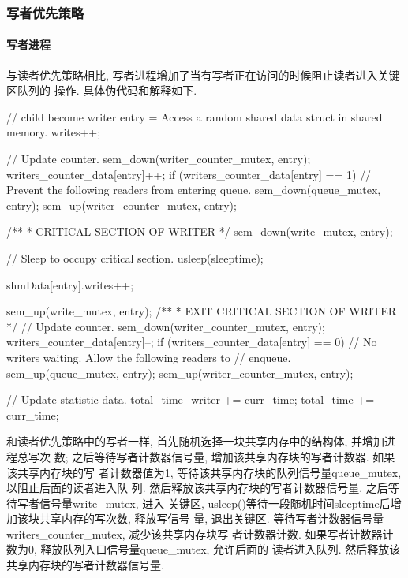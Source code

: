 \subsubsection{写者优先策略}
\paragraph{写者进程}
与读者优先策略相比, 写者进程增加了当有写者正在访问的时候阻止读者进入关键区队列的
操作. 具体伪代码和解释如下.
\begin{code}
// child become writer
entry = Access a random shared data struct in shared memory.
writes++;

// Update counter.
sem_down(writer_counter_mutex, entry);
writers_counter_data[entry]++;
if (writers_counter_data[entry] == 1) {
        // Prevent the following readers from entering queue.
        sem_down(queue_mutex, entry);
    }
sem_up(writer_counter_mutex, entry);

/**
* CRITICAL SECTION OF WRITER
*/
sem_down(write_mutex, entry);

// Sleep to occupy critical section.
    usleep(sleeptime);

    shmData[entry].writes++;

sem_up(write_mutex, entry);
    /**
    * EXIT CRITICAL SECTION OF WRITER
    */
// Update counter.
sem_down(writer_counter_mutex, entry);
writers_counter_data[entry]--;
if (writers_counter_data[entry] == 0) {
        // No writers waiting. Allow the following readers to
        // enqueue.
        sem_up(queue_mutex, entry);
    }
sem_up(writer_counter_mutex, entry);

    // Update statistic data.
    total_time_writer += curr_time;
    total_time += curr_time;

\end{code}

和读者优先策略中的写者一样, 首先随机选择一块共享内存中的结构体, 并增加进程总写次
数; 之后等待写者计数器信号量, 增加该共享内存块的写者计数器. 如果该共享内存块的写
者计数器值为1, 等待该共享内存块的队列信号量queue\_mutex, 以阻止后面的读者进入队
列. 然后释放该共享内存块的写者计数器信号量. 之后等待写者信号量write\_mutex, 进入
关键区, usleep()等待一段随机时间sleeptime后增加该块共享内存的写次数, 释放写信号
量, 退出关键区. 等待写者计数器信号量writers\_counter\_mutex, 减少该共享内存块写
者计数器计数. 如果写者计数器计数为0, 释放队列入口信号量queue\_mutex, 允许后面的
读者进入队列. 然后释放该共享内存块的写者计数器信号量.


